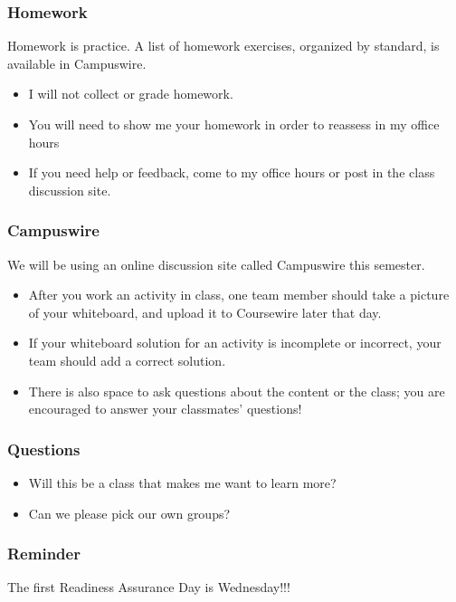 \documentclass[aspectration=1610]{beamer}
\begin{document}
\begin{frame}\frametitle{Homework}
Homework is practice.  A list of homework exercises, organized by standard, is available in Campuswire.
\begin{itemize}
\item I will not collect or grade homework.
\item You will need to show me your homework in order to reassess in my office hours
\item If you need help or feedback, come to my office hours or post in the class discussion site.
\end{itemize}
\end{frame}

\begin{frame}\frametitle{Campuswire}
We will be using an online discussion site called Campuswire this semester.
\begin{itemize}
\item After you work an activity in class, one team member should take a picture of your whiteboard, and upload it to Coursewire later that day.
\item If your whiteboard solution for an activity is incomplete or incorrect, your team should add a correct solution.
\item There is also space to ask questions about the content or the class; you are encouraged to answer your classmates' questions!
\end{itemize}

\end{frame}

\begin{frame}\frametitle{Questions}

\begin{itemize}
\item Will this be a class that makes me want to learn more? 
\item Can we please pick our own groups?
\end{itemize}
\end{frame}


\begin{frame}\frametitle{Reminder}
The first Readiness Assurance Day is Wednesday!!!
\end{frame}
\end{document}
